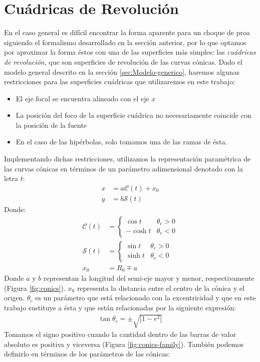 \section{Cuádricas de Revolución}
\label{sec:quadrics}
\newcommand\Sin{\ensuremath{\mathcal{S}}}
\newcommand\Cos{\ensuremath{\mathcal{C}}}
\newcommand\Cot{\ensuremath{\mathcal{T}}}


En el caso general es difícil encontrar la forma aparente para un choque de
proa siguiendo el formalismo desarrollado en la sección anterior, por lo que
optamos por aproximar la forma éstos con una de las superficies más simples:
las \textit{cuádricas de revolución}, que son superficies de revolución de
las curvas cónicas. Dado el modelo general descrito en la sección
\ref{sec:Modelo-generico}, haremos algunas restricciones para las superficies
cuádricas que utilizaremos en este trabajo:
\begin{itemize}
  \item El eje focal se encuentra alineado con el eje $x$
  \item La posición del foco de la superficie cuádrica no necesariamente coincide
    con la posición de la fuente
  \item En el caso de las hipérbolas, solo tomamos una de las ramas de ésta.
\end{itemize}
Implementando dichas restricciones, utilizamos la representación paramétrica de
las curvas cónicas en términos de un parámetro adimensional denotado con la letra
$t$:
\begin{align}
  x &= a\Cos(t) + x_0\\
  y &= b\Sin(t) 
\end{align}
Donde:
\begin{align}
  \Cos(t) &=\left\lbrace
  \begin{array}{lr}
    \cos{t} & \theta_c > 0\\
    -\cosh{t} & \theta_c < 0        
  \end{array}\right. \\
  \Sin(t) &= \left\lbrace
  \begin{array}{lr}
    \sin{t} & \theta_c > 0\\
    \sinh{t}  & \theta_c < 0
  \end{array} \right. \\
  x_0 &= R_0 \mp a \label{eq:x0} 
\end{align}
Donde $a$ y $b$ representan la longitud del semi-eje mayor y menor, respectivamente (Figura \ref{fig:conics}).
$x_0$ representa la distancia entre el centro de la cónica y el origen. 
$\theta_c$ es un parámetro que está relacionado con la excentricidad y que en este
trabajo sustituye a ésta y que están relacionadas por la siguiente expresión:
\begin{align}
  \tan\theta_c = \pm\sqrt{\left|1-e^2\right|}
\end{align}
Tomamos el signo positivo cuando la cantidad dentro de las barras de valor absoluto es
positiva y viceversa (Figura \ref{fig:conics-family}). También podemos definirlo en
términos de los parámetros de las cónicas:

